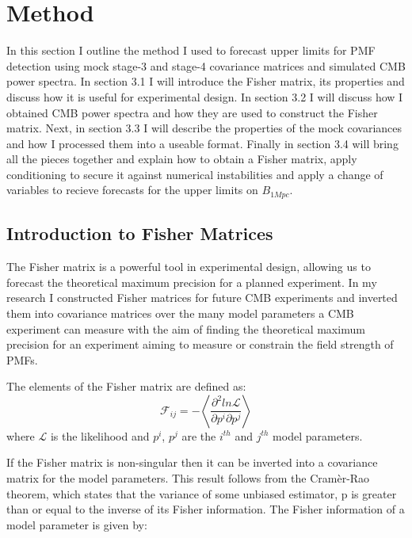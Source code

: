\section{Method}

In this section I outline the method I used to forecast upper limits for PMF detection using mock stage-3 and stage-4 covariance matrices and simulated CMB power spectra. In section 3.1 I will introduce the Fisher matrix, its properties and discuss how it is useful for experimental design. In section 3.2 I will discuss how I obtained CMB power spectra and how they are used to construct the Fisher matrix. Next, in section 3.3 I will describe the properties of the mock covariances and how I processed them into a useable format. Finally in section 3.4 will bring all the pieces together and explain how to obtain a Fisher matrix, apply conditioning to secure it against numerical instabilities and apply a change of variables to recieve forecasts for the upper limits on $B_{1Mpc}$.

\subsection{Introduction to Fisher Matrices}

The Fisher matrix is a powerful tool in experimental design, allowing us to forecast the theoretical maximum precision for a planned experiment. In my research I constructed Fisher matrices for future CMB experiments and inverted them into covariance matrices over the many model parameters a CMB experiment can measure with the aim of finding the theoretical maximum precision for an experiment aiming to measure or constrain the field strength of PMFs.

The elements of the Fisher matrix are defined as:
\begin{equation}
\label{eqn:likelihoodfisher}
\mathcal{F}_{ij} = - \left \langle \frac{\partial^{2}ln{\mathcal{L}}}{\partial p^i\partial p^j } \right \rangle
\end{equation}
where $\mathcal{L}$ is the likelihood and $p^{i}$, $p^{j}$ are the $i^{th}$ and $j^{th}$ model parameters.
  
If the Fisher matrix is non-singular then it can be inverted into a covariance matrix for the model parameters. This result follows from the Cram\`{e}r-Rao theorem, which states that the variance of some unbiased estimator, p is greater than or equal to the inverse of its Fisher information. The Fisher information of a model parameter is given by:

